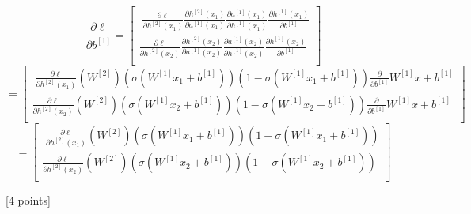 \documentclass{article}
\begin{document}
\begin{itemize}
{$$
\frac{\partial \ell}{\partial b^{[1]}}
= 
\begin{bmatrix} \;
\frac{\partial \ell}{\partial h^{[2]}(x_1)} 
\frac{\partial h^{[2]}(x_1)}{\partial a^{[1]}(x_1)}
\frac{\partial a^{[1]}(x_1)}{\partial h^{[1]}(x_1)} 
\frac{\partial h^{[1]}(x_1)}{\partial b^{[1]}} \\
\frac{\partial \ell}{\partial h^{[2]}(x_2)} 
\frac{\partial h^{[2]}(x_2)}{\partial a^{[1]}(x_2)}
\frac{\partial a^{[1]}(x_2)}{\partial h^{[1]}(x_2)} 
\frac{\partial h^{[1]}(x_2)}{\partial b^{[1]}} \\
\end{bmatrix} \;
$$
$$
=
\begin{bmatrix} \; 
\frac{\partial \ell}{\partial h^{[2]}(x_1)} (W^{[2]}) (\sigma( W^{[1]}x_1 + b^{[1]}))(1-\sigma( W^{[1]}x_1 + b^{[1]}))
\frac{\partial}{\partial b^{[1]}} W^{[1]}x + b^{[1]} \\
\frac{\partial \ell}{\partial h^{[2]}(x_2)} (W^{[2]}) (\sigma( W^{[1]}x_2 + b^{[1]}))(1-\sigma( W^{[1]}x_2 + b^{[1]}))
\frac{\partial}{\partial b^{[1]}} W^{[1]}x + b^{[1]} \\
\end{bmatrix} \;
$$
$$
= 
\begin{bmatrix} \; 
\frac{\partial \ell}{\partial h^{[2]}(x_1)} (W^{[2]}) (\sigma( W^{[1]}x_1 + b^{[1]}))(1-\sigma( W^{[1]}x_1 + b^{[1]})) \\
\frac{\partial \ell}{\partial h^{[2]}(x_2)} (W^{[2]}) (\sigma( W^{[1]}x_2 + b^{[1]}))(1-\sigma( W^{[1]}x_2 + b^{[1]})) \\
\end{bmatrix} \; 
$$
    
    
    
    }
    
\end{itemize}

\noindent {} [4 points]
\end{document}
